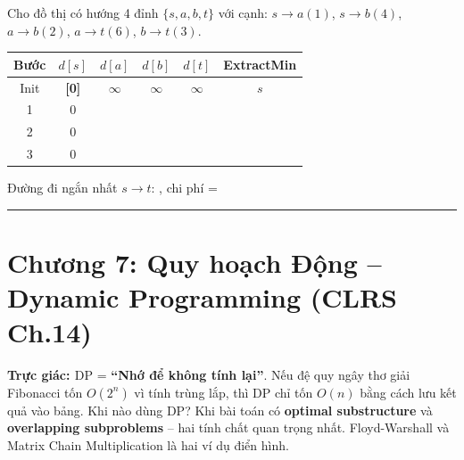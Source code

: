 \documentclass[10pt]{article}
\newcommand{\intuition}[1]{%
  \begin{tcolorbox}[colback=blue!5!white, colframe=blue!60!white, leftrule=3pt,
    toprule=0pt, bottomrule=0pt, rightrule=0pt,
    boxsep=2pt, left=6pt, right=6pt, top=4pt, bottom=4pt]
  \small\textbf{\textcolor{blue!80!black}{Trực giác: }}#1
  \end{tcolorbox}}
\newenvironment{traceyourself}[1]{%
  \begin{tcolorbox}[colback=green!5!white, colframe=green!60!black, leftrule=3pt,
    toprule=0pt, bottomrule=0pt, rightrule=0pt,
    boxsep=2pt, left=6pt, right=6pt, top=4pt, bottom=4pt,
    title={\small\textcolor{green!80!black}{$\triangleright$ Tự Trace: #1}}]
  \small
}{\end{tcolorbox}}
\begin{document}
\begin{traceyourself}{Dijkstra -- Trace bảng khoảng cách}
Cho đồ thị có hướng 4 đỉnh $\{s,a,b,t\}$ với cạnh: $s{\to}a(1)$, $s{\to}b(4)$, $a{\to}b(2)$, $a{\to}t(6)$, $b{\to}t(3)$.

\begin{center}
\begin{tabular}{|c|c|c|c|c|c|}
\hline
\textbf{Bước} & $d[s]$ & $d[a]$ & $d[b]$ & $d[t]$ & \textbf{ExtractMin} \\
\hline
Init & \textbf{[0]} & $\infty$ & $\infty$ & $\infty$ & $s$ \\
\hline
1 & 0 & \underline{\hspace{1.5cm}} & \underline{\hspace{1.5cm}} & \underline{\hspace{1.5cm}} & \underline{\hspace{1.5cm}} \\
\hline
2 & 0 & \underline{\hspace{1.5cm}} & \underline{\hspace{1.5cm}} & \underline{\hspace{1.5cm}} & \underline{\hspace{1.5cm}} \\
\hline
3 & 0 & \underline{\hspace{1.5cm}} & \underline{\hspace{1.5cm}} & \underline{\hspace{1.5cm}} & \underline{\hspace{1.5cm}} \\
\hline
\end{tabular}
\end{center}

Đường đi ngắn nhất $s \to t$: \underline{\hspace{4cm}}, chi phí = \underline{\hspace{2cm}}
\end{traceyourself}


\begin{center}\rule{0.5\linewidth}{0.5pt}\end{center}

\section{Chương 7: Quy hoạch Động -- Dynamic Programming (CLRS Ch.14)}\label{chux1b0ux1a1ng-7-quy-houx1ea1ch-ux111ux1ed9ng-dp-clrs-ch.14}

\intuition{DP = \textbf{``Nhớ để không tính lại''}. Nếu đệ quy ngây thơ giải Fibonacci tốn $O(2^n)$ vì tính trùng lắp, thì DP chỉ tốn $O(n)$ bằng cách lưu kết quả vào bảng. Khi nào dùng DP? Khi bài toán có \textbf{optimal substructure} và \textbf{overlapping subproblems} -- hai tính chất quan trọng nhất. Floyd-Warshall và Matrix Chain Multiplication là hai ví dụ điển hình.}
\end{document}
